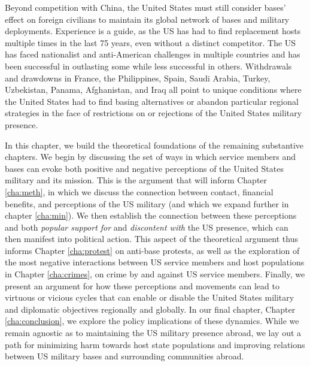 Beyond competition with China, the United States must still consider bases' effect on foreign civilians to maintain its global network of bases and military deployments. Experience is a guide, as the US has had to find replacement hosts multiple times in the last 75 years, even without a distinct competitor. The US has faced nationalist and anti-American challenges in multiple countries and has been successful in outlasting some while less successful in others.\autocite{blaker1990,Baker2004} Withdrawals and drawdowns in France, the Philippines, Spain, Saudi Arabia, Turkey, Uzbekistan, Panama, Afghanistan, and Iraq all point to unique conditions where the United States had to find basing alternatives or abandon particular regional strategies in the face of restrictions on or rejections of the United States military presence. 

In this chapter, we build the theoretical foundations of the remaining substantive chapters. We begin by discussing the set of ways in which service members and bases can evoke both positive and negative perceptions of the United States military and its mission. This is the argument that will inform Chapter \ref{cha:meth}, in which we discuss the connection between contact, financial benefits, and perceptions of the US military (and which we expand further in chapter \ref{cha:min}).  We then establish the connection between these perceptions and both \textit{popular support for} and \textit{\textit{discontent with}} the US presence, which can then manifest into political action. This aspect of the theoretical argument thus informs Chapter \ref{cha:protest} on anti-base protests, as well as the exploration of the most negative interactions between US service members and host populations in Chapter \ref{cha:crimes}, on crime by and against US service members. Finally, we present an argument for how these perceptions and movements can lead to virtuous or vicious cycles that can enable or disable the United States military and diplomatic objectives regionally and globally. In our final chapter, Chapter \ref{cha:conclusion}, we explore the policy implications of these dynamics. While we remain agnostic as to maintaining the US military presence abroad, we lay out a path for minimizing harm towards host state populations and improving relations between US military bases and surrounding communities abroad.  


